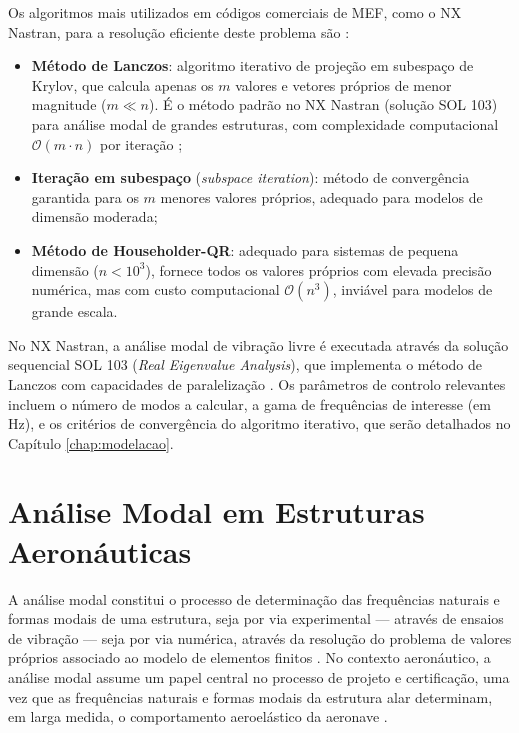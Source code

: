 \documentclass[11pt,twoside,a4paper]{report}
\begin{document}
Os algoritmos mais utilizados em códigos comerciais de MEF, como o NX Nastran, para a resolução eficiente deste problema são \cite{Bathe2014}:

\begin{itemize}
    \item \textbf{Método de Lanczos}: algoritmo iterativo de projeção em subespaço de Krylov, que calcula apenas os $m$ valores e vetores próprios de menor magnitude ($m \ll n$). É o método padrão no NX Nastran (solução SOL 103) para análise modal de grandes estruturas, com complexidade computacional $\mathcal{O}(m \cdot n)$ por iteração \cite{Nastran2014};

    \item \textbf{Iteração em subespaço} (\textit{subspace iteration}): método de convergência garantida para os $m$ menores valores próprios, adequado para modelos de dimensão moderada;

    \item \textbf{Método de Householder-QR}: adequado para sistemas de pequena dimensão ($n < 10^3$), fornece todos os valores próprios com elevada precisão numérica, mas com custo computacional $\mathcal{O}(n^3)$, inviável para modelos de grande escala.
\end{itemize}

No NX Nastran, a análise modal de vibração livre é executada através da solução sequencial SOL 103 (\textit{Real Eigenvalue Analysis}), que implementa o método de Lanczos com capacidades de paralelização \cite{Nastran2014}. Os parâmetros de controlo relevantes incluem o número de modos a calcular, a gama de frequências de interesse (em \si{\hertz}), e os critérios de convergência do algoritmo iterativo, que serão detalhados no Capítulo \ref{chap:modelacao}.

\section{Análise Modal em Estruturas Aeronáuticas}

A análise modal constitui o processo de determinação das frequências naturais e formas modais de uma estrutura, seja por via experimental --- através de ensaios de vibração --- seja por via numérica, através da resolução do problema de valores próprios associado ao modelo de elementos finitos \cite{Ewins2000, Maia1997}. No contexto aeronáutico, a análise modal assume um papel central no processo de projeto e certificação, uma vez que as frequências naturais e formas modais da estrutura alar determinam, em larga medida, o comportamento aeroelástico da aeronave \cite{Wright2015}.
\end{document}
